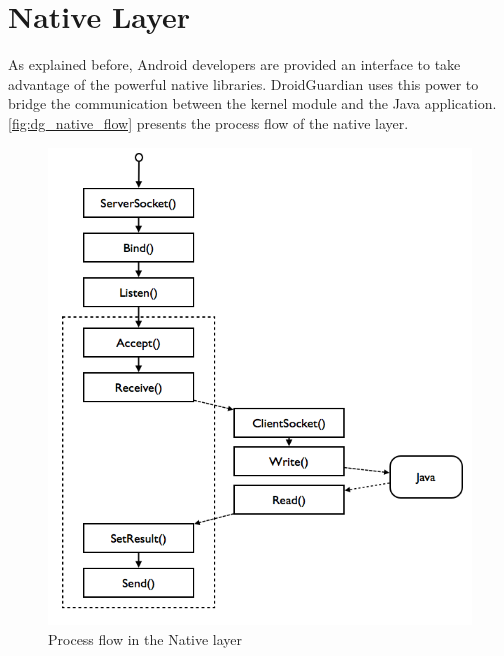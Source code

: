 \section{Native Layer}

As explained before, Android developers are provided an interface to take advantage of the powerful native libraries. DroidGuardian uses this power to bridge the communication between the kernel module and the Java application. \autoref{fig:dg_native_flow} presents the process flow of the native layer.

\begin{figure}[h]
 \centering
 \includegraphics[scale=0.5]{figures/dg_native_flow.png}
 \caption{Process flow in the Native layer}
 \label{fig:dg_native_flow}
\end{figure}

